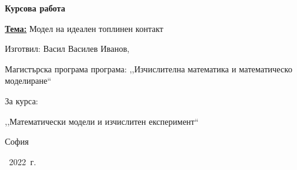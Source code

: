 \begin{titlepage}
    \thispagestyle{fancy}
    \begin{center}
        \hfill \break
        \hfill \break
        \hfill \break
        \Huge	
        \textbf{Курсова работа}\\
        \vspace{3cm}
    \end{center}
    \normalsize	
    \textbf{\underline{Тема:}} Модел на идеален топлинен контакт
    \vspace{2cm}

    \begin{flushright}
        \normalsize	
        Изготвил: Васил Василев Иванов,

        Магистърска програма програма: ,,Изчислителна математика и математическо моделиране``
        \vspace{1cm}

        За курса:

        ,,Математически модели и изчислитен експеримент``
    \end{flushright}

    \vspace*{\fill}
    \begin{center}
        \footnotesize	
        София

         ~2022~г.
    \end{center}
 \end{titlepage}